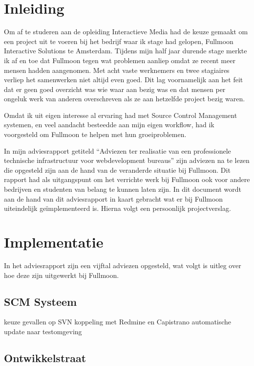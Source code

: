 \section{Inleiding}

Om af te studeren aan de opleiding Interactieve Media had de keuze gemaakt om een project uit te voeren bij het bedrijf waar ik stage had gelopen, Fullmoon Interactive Solutions te Amsterdam. Tijdens mijn half jaar durende stage merkte ik af en toe dat Fullmoon tegen wat problemen aanliep omdat ze recent meer mensen hadden aangenomen. Met acht vaste werknemers en twee stagiaires verliep het samenwerken niet altijd even goed. Dit lag voornamelijk aan het feit dat er geen goed overzicht was wie waar aan bezig was en dat mensen per ongeluk werk van anderen overschreven als ze aan hetzelfde project bezig waren.

Omdat ik uit eigen interesse al ervaring had met Source Control Management systemen, en veel aandacht besteedde aan mijn eigen workflow, had ik voorgesteld om Fullmoon te helpen met hun groeiproblemen.

In mijn adviesrapport getiteld ``Adviezen ter realisatie van een professionele technische infrastructuur voor webdevelopment bureaus'' zijn adviezen na te lezen die opgesteld zijn aan de hand van de veranderde situatie bij Fullmoon. Dit rapport had als uitgangspunt om het verrichte werk bij Fullmoon ook voor andere bedrijven en studenten van belang te kunnen laten zijn. In dit document wordt aan de hand van dit adviesrapport in kaart gebracht wat er bij Fullmoon uiteindelijk geïmplementeerd is. Hierna volgt een persoonlijk projectverslag.

\section{Implementatie}

In het adviesrapport zijn een vijftal adviezen opgesteld, wat volgt is uitleg over hoe deze zijn uitgewerkt bij Fullmoon.

\subsection{SCM Systeem}

keuze gevallen op SVN
koppeling met Redmine en Capistrano
automatische update naar testomgeving

\subsection{Ontwikkelstraat}

